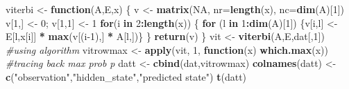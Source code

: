 \documentclass[
]{article}
\newenvironment{Shaded}{\begin{snugshade}}{\end{snugshade}}
\newcommand{\CommentTok}[1]{\textcolor[rgb]{0.56,0.35,0.01}{\textit{#1}}}
\newcommand{\ControlFlowTok}[1]{\textcolor[rgb]{0.13,0.29,0.53}{\textbf{#1}}}
\newcommand{\DataTypeTok}[1]{\textcolor[rgb]{0.13,0.29,0.53}{#1}}
\newcommand{\DecValTok}[1]{\textcolor[rgb]{0.00,0.00,0.81}{#1}}
\newcommand{\KeywordTok}[1]{\textcolor[rgb]{0.13,0.29,0.53}{\textbf{#1}}}
\newcommand{\NormalTok}[1]{#1}
\newcommand{\OperatorTok}[1]{\textcolor[rgb]{0.81,0.36,0.00}{\textbf{#1}}}
\newcommand{\OtherTok}[1]{\textcolor[rgb]{0.56,0.35,0.01}{#1}}
\newcommand{\StringTok}[1]{\textcolor[rgb]{0.31,0.60,0.02}{#1}}
\begin{document}
\begin{Shaded}
\begin{Highlighting}[]
\NormalTok{viterbi <-}\StringTok{ }\ControlFlowTok{function}\NormalTok{(A,E,x) \{}
\NormalTok{v <-}\StringTok{ }\KeywordTok{matrix}\NormalTok{(}\OtherTok{NA}\NormalTok{, }\DataTypeTok{nr=}\KeywordTok{length}\NormalTok{(x), }\DataTypeTok{nc=}\KeywordTok{dim}\NormalTok{(A)[}\DecValTok{1}\NormalTok{])}
\NormalTok{v[}\DecValTok{1}\NormalTok{,] <-}\StringTok{ }\DecValTok{0}\NormalTok{; v[}\DecValTok{1}\NormalTok{,}\DecValTok{1}\NormalTok{] <-}\StringTok{ }\DecValTok{1}
\ControlFlowTok{for}\NormalTok{(i }\ControlFlowTok{in} \DecValTok{2}\OperatorTok{:}\KeywordTok{length}\NormalTok{(x)) \{}
\ControlFlowTok{for}\NormalTok{ (l }\ControlFlowTok{in} \DecValTok{1}\OperatorTok{:}\KeywordTok{dim}\NormalTok{(A)[}\DecValTok{1}\NormalTok{]) \{v[i,l] <-}\StringTok{ }\NormalTok{E[l,x[i]] }\OperatorTok{*}\StringTok{ }\KeywordTok{max}\NormalTok{(v[(i}\DecValTok{-1}\NormalTok{),] }\OperatorTok{*}\StringTok{ }\NormalTok{A[l,])\}}
\NormalTok{\}}
\KeywordTok{return}\NormalTok{(v)}
\NormalTok{\}}
\NormalTok{vit <-}\StringTok{ }\KeywordTok{viterbi}\NormalTok{(A,E,dat[,}\DecValTok{1}\NormalTok{]) }\CommentTok{#using algorithm}
\NormalTok{vitrowmax <-}\StringTok{ }\KeywordTok{apply}\NormalTok{(vit, }\DecValTok{1}\NormalTok{, }\ControlFlowTok{function}\NormalTok{(x) }\KeywordTok{which.max}\NormalTok{(x)) }\CommentTok{#tracing back max prob p}
\NormalTok{datt <-}\StringTok{ }\KeywordTok{cbind}\NormalTok{(dat,vitrowmax)}
\KeywordTok{colnames}\NormalTok{(datt) <-}\StringTok{ }\KeywordTok{c}\NormalTok{(}\StringTok{"observation"}\NormalTok{,}\StringTok{"hidden_state"}\NormalTok{,}\StringTok{"predicted state"}\NormalTok{)}
\KeywordTok{t}\NormalTok{(datt)}
\end{Highlighting}
\end{Shaded}
\end{document}
